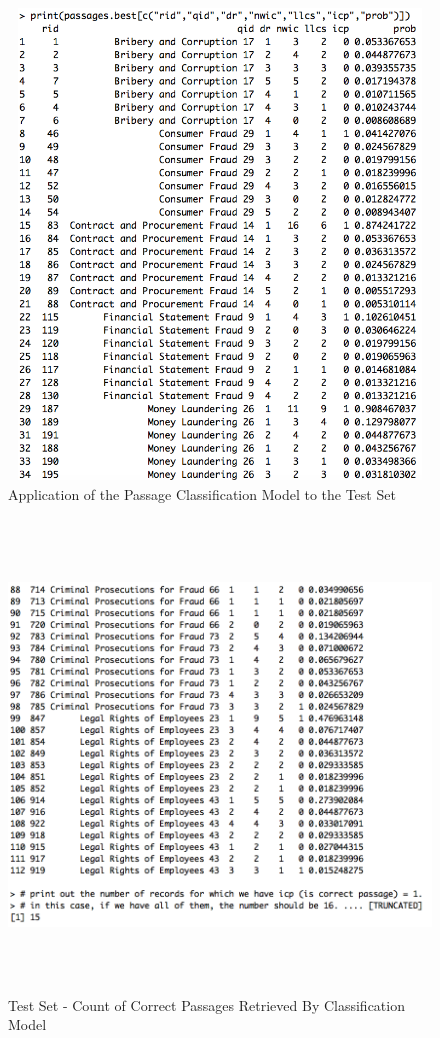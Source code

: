 \begin{figure}
\centering
\vspace{1.0in}
\includegraphics[width=125mm, height=125mm]{logit_model_test_set_top.png}
\caption{Application of the Passage Classification Model to the Test Set}
\label{fig:logit_model_test_set_top}
\end{figure}

\begin{figure}
\centering
\vspace{1.0in}
\includegraphics[width=125mm, height=125mm]{logit_model_test_set_bottom.png}
\caption{Test Set - Count of Correct Passages Retrieved By Classification Model}
\label{fig:test_set_correct_passage_count}
\end{figure}





